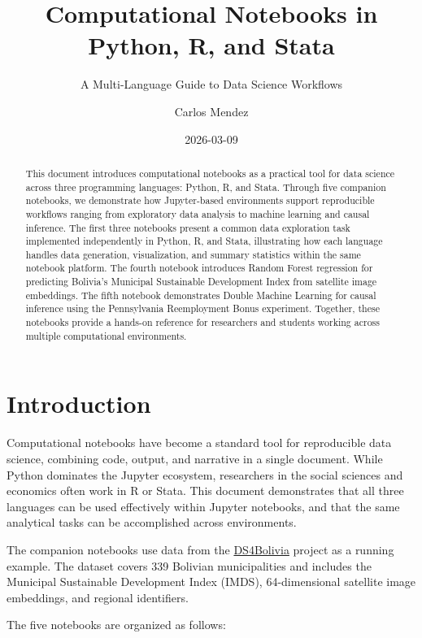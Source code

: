 \documentclass[
  letterpaper,
  DIV=11,
  numbers=noendperiod]{scrartcl}
\title{Computational Notebooks in Python, R, and Stata}
\subtitle{A Multi-Language Guide to Data Science Workflows}
\author{Carlos Mendez}
\date{2026-03-09}
\begin{document}
\maketitle
\begin{abstract}
This document introduces computational notebooks as a practical tool for
data science across three programming languages: Python, R, and Stata.
Through five companion notebooks, we demonstrate how Jupyter-based
environments support reproducible workflows ranging from exploratory
data analysis to machine learning and causal inference. The first three
notebooks present a common data exploration task implemented
independently in Python, R, and Stata, illustrating how each language
handles data generation, visualization, and summary statistics within
the same notebook platform. The fourth notebook introduces Random Forest
regression for predicting Bolivia's Municipal Sustainable Development
Index from satellite image embeddings. The fifth notebook demonstrates
Double Machine Learning for causal inference using the Pennsylvania
Reemployment Bonus experiment. Together, these notebooks provide a
hands-on reference for researchers and students working across multiple
computational environments.
\end{abstract}


\section{Introduction}\label{sec-introduction}

Computational notebooks have become a standard tool for reproducible
data science, combining code, output, and narrative in a single
document. While Python dominates the Jupyter ecosystem, researchers in
the social sciences and economics often work in R or Stata. This
document demonstrates that all three languages can be used effectively
within Jupyter notebooks, and that the same analytical tasks can be
accomplished across environments.

The companion notebooks use data from the
\href{https://github.com/quarcs-lab/ds4bolivia}{DS4Bolivia} project as a
running example. The dataset covers 339 Bolivian municipalities and
includes the Municipal Sustainable Development Index (IMDS),
64-dimensional satellite image embeddings, and regional identifiers.

The five notebooks are organized as follows:
\end{document}
